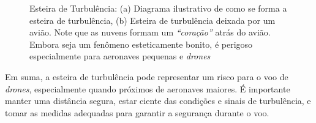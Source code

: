 \documentclass[a4paper, 12pt, onecolumn,singlespacing]{article}
\begin{document}
	
	\begin{figure}[!htb]
		 \hfill
		\caption{Esteira de Turbulência: (a) Diagrama ilustrativo de como se forma a esteira de turbulência, (b) Esteira de turbulência deixada por um avião. Note que as nuvens formam um \textit{``coração''} atrás do avião. Embora seja um fenômeno esteticamente bonito, é perigoso especialmente para aeronaves pequenas e \textit{drones}}
		\label{fig:esteira_turbulencia}
		
	\end{figure}
	
	Em suma, a esteira de turbulência pode representar um risco para o voo de \textit{drones}, especialmente quando próximos de aeronaves maiores. É importante manter uma distância segura, estar ciente das condições e sinais de turbulência, e tomar as medidas adequadas para garantir a segurança durante o voo.
\end{document}
